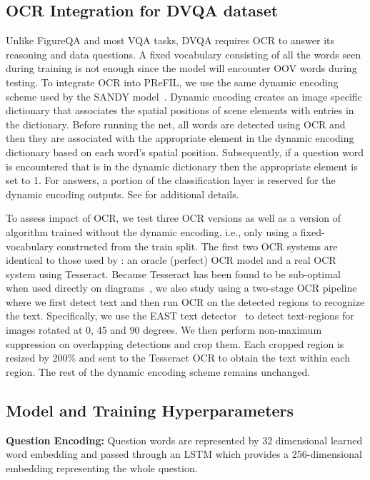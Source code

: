 \documentclass[10pt,twocolumn]{article}
\begin{document}
\subsection{OCR Integration for DVQA dataset}\label{subsec:OCR}

Unlike FigureQA and most VQA tasks, DVQA requires OCR to answer its reasoning and data questions.  A fixed vocabulary consisting of all the words seen during training is not enough since the model will encounter OOV words during testing. To integrate OCR into PReFIL, we use the same dynamic encoding scheme used by the SANDY model~\cite{kafle2018dvqa}. Dynamic encoding creates an image specific dictionary that associates the spatial positions of scene elements with entries in the dictionary.  Before running the net, all words are detected using OCR and then they are associated with the appropriate element in the dynamic encoding dictionary based on each word's spatial position. Subsequently, if a question word is encountered that is in the dynamic dictionary then the appropriate element is set to 1. For answers, a portion of the classification layer is reserved for the dynamic encoding outputs. See \cite{kafle2018dvqa} for additional details.

To assess impact of OCR, we test three OCR versions as well as a version of algorithm trained without the dynamic encoding, i.e., only using a fixed-vocabulary constructed from the train split. The first two OCR systems are identical to those used by \cite{kafle2018dvqa}: an oracle (perfect) OCR model and a real OCR system using Tesseract. Because Tesseract has been found to be sub-optimal when used directly on diagrams~\cite{kembhavi2016diagram}, we also study using a two-stage OCR pipeline where we first detect text and then run OCR on the detected regions to recognize the text. Specifically, we use the EAST text detector~\cite{zhou2017east} to detect text-regions for images rotated at 0, 45 and 90 degrees. We then perform non-maximum suppression on overlapping detections and crop them. Each cropped region is resized by 200\% and sent to the Tesseract OCR to obtain the text within each region. The rest of the dynamic encoding scheme remains unchanged.

\subsection{Model and Training Hyperparameters}

\textbf{Question Encoding:} Question words are represented by 32 dimensional learned word embedding and passed through an LSTM which provides a 256-dimensional embedding representing the whole question.
\end{document}
